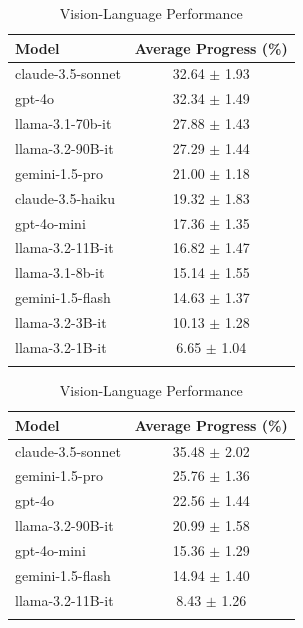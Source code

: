 \begin{table}[h]
\centering
\begin{minipage}[t]{0.48\linewidth}
\centering
\caption{Language-Only Performance}
\begin{tabular}{lc}
\toprule
Model & Average Progress (\%) \\
\midrule
claude-3.5-sonnet & 32.64 $\pm$ 1.93 \\
gpt-4o & 32.34 $\pm$ 1.49 \\
llama-3.1-70b-it & 27.88 $\pm$ 1.43 \\
llama-3.2-90B-it & 27.29 $\pm$ 1.44 \\
gemini-1.5-pro & 21.00 $\pm$ 1.18 \\
claude-3.5-haiku & 19.32 $\pm$ 1.83 \\
gpt-4o-mini & 17.36 $\pm$ 1.35 \\
llama-3.2-11B-it & 16.82 $\pm$ 1.47 \\
llama-3.1-8b-it & 15.14 $\pm$ 1.55 \\
gemini-1.5-flash & 14.63 $\pm$ 1.37 \\
llama-3.2-3B-it & 10.13 $\pm$ 1.28 \\
llama-3.2-1B-it & 6.65 $\pm$ 1.04 \\
\bottomrule
\label{llm_table}
\end{tabular}
\end{minipage}
\hfill
\begin{minipage}[t]{0.48\linewidth}
\centering
\caption{Vision-Language Performance}
\begin{tabular}{lc}
\toprule
Model & Average Progress (\%) \\
\midrule
claude-3.5-sonnet & 35.48 $\pm$ 2.02 \\
gemini-1.5-pro & 25.76 $\pm$ 1.36 \\
gpt-4o & 22.56 $\pm$ 1.44 \\
llama-3.2-90B-it & 20.99 $\pm$ 1.58 \\
gpt-4o-mini & 15.36 $\pm$ 1.29 \\
gemini-1.5-flash & 14.94 $\pm$ 1.40 \\
llama-3.2-11B-it & 8.43 $\pm$ 1.26 \\
\bottomrule
\label{vlm_table}
\end{tabular}
\end{minipage}
\vspace{-0.2in}
\end{table}






